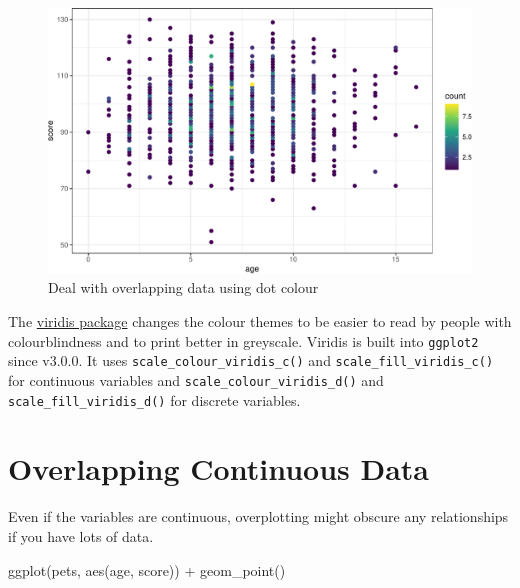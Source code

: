 \documentclass[
  oneside]{book}
\newenvironment{Shaded}{\begin{snugshade}}{\end{snugshade}}
\newcommand{\FunctionTok}[1]{\textcolor[rgb]{0.00,0.00,0.00}{#1}}
\newcommand{\NormalTok}[1]{#1}
\newcommand{\SpecialCharTok}[1]{\textcolor[rgb]{0.00,0.00,0.00}{#1}}
\begin{document}
\begin{figure}

{\centering \includegraphics[width=0.9\linewidth]{images/overlap-colour-1} 

}

\caption{Deal with overlapping data using dot colour}\label{fig:overlap-colour}
\end{figure}

\begin{info}
The \href{https://cran.r-project.org/web/packages/viridis/vignettes/intro-to-viridis.html}{viridis package} changes the colour themes to be easier to read by people with colourblindness and to print better in greyscale. Viridis is built into \texttt{ggplot2} since v3.0.0. It uses \texttt{scale\_colour\_viridis\_c()} and \texttt{scale\_fill\_viridis\_c()} for continuous variables and \texttt{scale\_colour\_viridis\_d()} and \texttt{scale\_fill\_viridis\_d()} for discrete variables.

\end{info}

\hypertarget{overlapping-continuous-data}{%
\section{Overlapping Continuous Data}\label{overlapping-continuous-data}}

Even if the variables are continuous, overplotting might obscure any relationships if you have lots of data.

\begin{Shaded}
\begin{Highlighting}[]
\FunctionTok{ggplot}\NormalTok{(pets, }\FunctionTok{aes}\NormalTok{(age, score)) }\SpecialCharTok{+}
  \FunctionTok{geom\_point}\NormalTok{()}
\end{Highlighting}
\end{Shaded}
\end{document}
